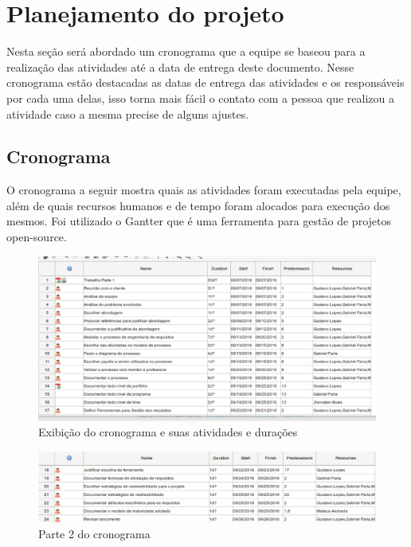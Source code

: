 \chapter{Planejamento do projeto}

Nesta seção será abordado um cronograma que a equipe se baseou para a realização das atividades até a data de entrega deste documento. Nesse cronograma estão destacadas as datas de entrega das atividades e os responsáveis por cada uma delas, isso torna mais fácil o contato com a pessoa que realizou a atividade caso a mesma precise de alguns ajustes.

\section{Cronograma}

	O cronograma a seguir mostra quais as atividades foram executadas pela equipe, além de quais recursos humanos e de tempo foram alocados para execução dos mesmos. Foi utilizado o Gantter que é uma ferramenta para gestão de projetos open-source.

	\begin{figure}[!htpb]
	\centering
	\includegraphics[scale=0.4]{figuras/cronograma/parte1}
	\caption{Exibição do cronograma e suas atividades e durações}
	\end{figure}

	\begin{figure}[!htpb]
	\centering
	\includegraphics[scale=0.4]{figuras/cronograma/parte2}
	\caption{Parte 2 do cronograma}
	\end{figure}
